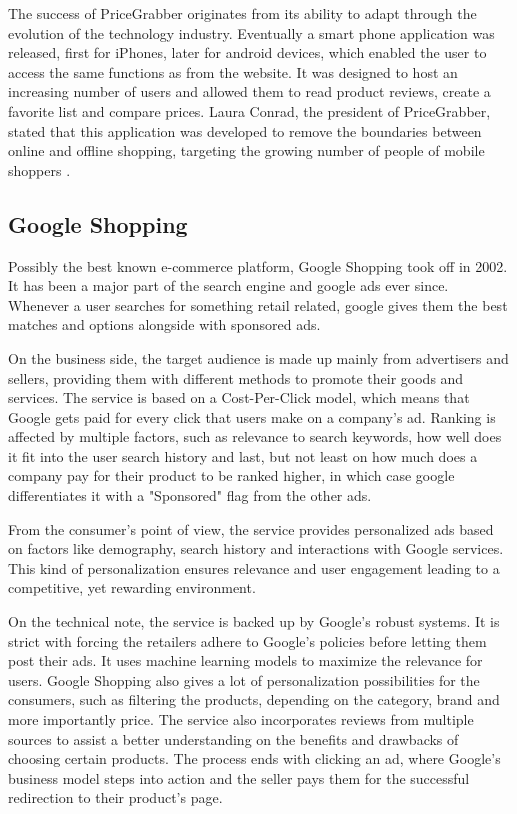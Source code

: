 The success of PriceGrabber originates from its ability to adapt through the evolution of the technology industry. Eventually a smart phone application was released, first for iPhones, later for android devices, which enabled the user to access the same functions as from the website. It was designed to host an increasing number of users and allowed them to read product reviews, create a favorite list and compare prices. Laura Conrad, the president of PriceGrabber, stated that this application was developed to remove the boundaries between online and offline shopping, targeting the growing number of people of mobile shoppers \cite{HarnickPriceGrabberApp}.

\subsection{Google Shopping}

Possibly the best known e-commerce platform, Google Shopping took off in 2002. It has been a major part of the search engine and google ads ever since. Whenever a user searches for something retail related, google gives them the best matches and options alongside with sponsored ads.

On the business side, the target audience is made up mainly from advertisers and sellers, providing them with different methods to promote their goods and services. The service is based on a Cost-Per-Click model, which means that Google gets paid for every click that users make on a company's ad. Ranking is affected by multiple factors, such as relevance to search keywords, how well does it fit into the user search history and last, but not least on how much does a company pay for their product to be ranked higher, in which case google differentiates it with a "Sponsored" flag from the other ads.

From the consumer's point of view, the service provides personalized ads based on factors like demography, search history and interactions with Google services. This kind of personalization ensures relevance and user engagement leading to a competitive, yet rewarding environment.

On the technical note, the service is backed up by Google's robust systems. It is strict with forcing the retailers adhere to Google's policies before letting them post their ads. It uses machine learning models to maximize the relevance for users. Google Shopping also gives a lot of personalization possibilities for the consumers, such as filtering the products, depending on the category, brand and more importantly price. The service also incorporates reviews from multiple sources to assist a better understanding on the benefits and drawbacks of choosing certain products. The process ends with clicking an ad, where Google's business model steps into action and the seller pays them for the successful redirection to their product's page. \cite{Google2023}

